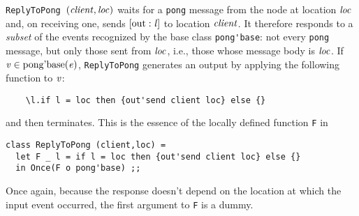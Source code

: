\documentclass[final]{article}
\newcommand{\dgclassrel}[3]{\NUPRLclassrel{}{#1}{}{#2}{#3}}
\newcommand{\listinline}[1]{\text{\lstinline{#1}}}
\newcommand{\msg}[2]{\ensuremath{[\listinline{#1}:\NUPRL{#2}]}}
\begin{document}
\lstinline{ReplyToPong}~$\mathit{(client,loc)}$ waits for a
\lstinline{pong} message from the node at location $\mathit{loc}$ and,
on receiving one, sends \msg{out}{l} to location $\mathit{client}$.  It
therefore responds to a \emph{subset} of the events recognized by the
base class \lstinline{pong'base}: not every \lstinline{pong} message,
but only those sent from $\mathit{loc}$, i.e., those whose message body
is $\mathit{loc}$.  If
$\dgclassrel{\NUPRLevent}{\text{\lstinline{pong'base}}}{\NUPRL{v}}$,
\lstinline{ReplyToPong} generates an output by applying the following
function to $\mathit{v}$:
\begin{lstlisting}
    \l.if l = loc then {out'send client loc} else {}
\end{lstlisting}
and then terminates.  This is the essence of the locally defined
function \lstinline{F} in
\begin{emlcode}
\begin{lstlisting}
class ReplyToPong (client,loc) =
  let F _ l = if l = loc then {out'send client loc} else {}
  in Once(F o pong'base) ;;
\end{lstlisting}
\end{emlcode}
Once again, because the response doesn't depend on the location at
which the input event occurred, the first argument to \lstinline{F} is
a dummy.


\end{document}
